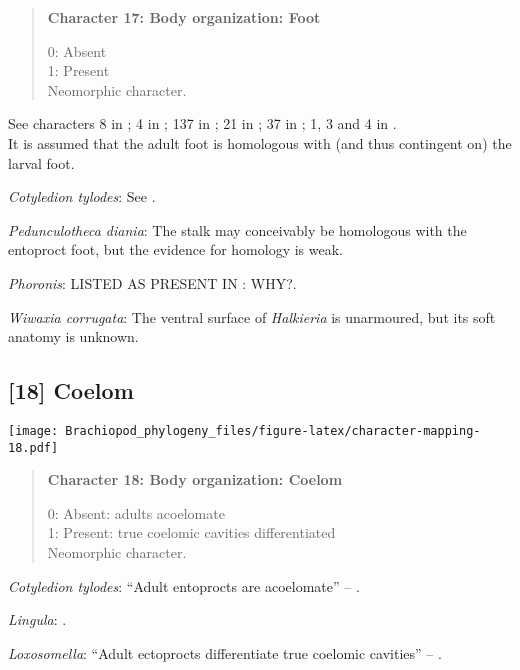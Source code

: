 \documentclass[openany]{book}
\theoremstyle{definition}
\theoremstyle{definition}
\theoremstyle{definition}
\theoremstyle{remark}
\begin{document}
\begin{quote}
\textbf{Character 17: Body organization: Foot}

0: Absent\\
1: Present\\
Neomorphic character.
\end{quote}

See characters 8 in \citet{Haszprunar1996}; 4 in \citet{Vinther2008};
137 in \citet{Rouse1999}; 21 in \citet{BucklandNicks2008}; 37 in
\citet{Sutton2012}; 1, 3 and 4 in \citet{Haszprunar2008}.\\
It is assumed that the adult foot is homologous with (and thus
contingent on) the larval foot.

\hypertarget{Cotyledion_tylodes-coding-17}{}
\emph{Cotyledion tylodes}: See \citet{Haszprunar2008}.

\hypertarget{Pedunculotheca_diania-coding-17}{}
\emph{Pedunculotheca diania}: The stalk may conceivably be homologous
with the entoproct foot, but the evidence for homology is weak.

\hypertarget{Phoronis-coding-17}{}
\emph{Phoronis}: LISTED AS PRESENT IN \citet{Smith2012}: WHY?.

\hypertarget{Wiwaxia_corrugata-coding-17}{}
\emph{Wiwaxia corrugata}: The ventral surface of \emph{Halkieria} is
unarmoured, but its soft anatomy is unknown.

\subsection*{{[}18{]} Coelom}\label{coelom}

\texttt{[image: Brachiopod\_phylogeny\_files/figure-latex/character-mapping-18.pdf]}

\begin{quote}
\textbf{Character 18: Body organization: Coelom}

0: Absent: adults acoelomate\\
1: Present: true coelomic cavities differentiated\\
Neomorphic character.
\end{quote}

\hypertarget{Cotyledion_tylodes-coding-18}{}
\emph{Cotyledion tylodes}: ``Adult entoprocts are acoelomate'' --
\citet{Fuchs2008}.

\hypertarget{Lingula-coding-18}{}
\emph{Lingula}: \citet{Temereva2017Innervationof}.

\hypertarget{Loxosomella-coding-18}{}
\emph{Loxosomella}: ``Adult ectoprocts differentiate true coelomic
cavities'' -- \citet{Fuchs2008}.
\end{document}
